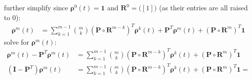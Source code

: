 \documentclass[\main/main.tex]{subfiles}
\begin{document}
further simplify since $\bm{\rho}^0(t) = \bm{1}$ and $\mathbf{R}^0 = \big ([1]\big)$ (as their entries are all raised to $0$):
\begin{equation}\label{mom}
\begin{split}
     \bm{\rho}^m(t) &= 
     \sum_{k=1}^{m-1} {m \choose k} (\mathbf{P} \circ \mathbf{R}^{m-k}) ^ T \bm{\rho}^k(t) +
     \mathbf{P} ^ T \bm{\rho}^m(t) + (\mathbf{P} \circ \mathbf{R}^{m}) ^ T \bm{1}
\end{split}
    \end{equation}
solve for $\bm{\rho}^m(t)$:    
\begin{equation}
\begin{split}
     \bm{\rho}^m(t) - \mathbf{P} ^ T \bm{\rho}^m(t) &= 
     \sum_{k=1}^{m-1} {m \choose k} (\mathbf{P} \circ \mathbf{R}^{m-k}) ^ T \bm{\rho}^k(t)
     + (\mathbf{P} \circ \mathbf{R}^{m}) ^ T \bm{1}\\
     ( \mathbf{I} - \mathbf{P}^T)  \bm{\rho}^m(t) &= 
     \sum_{k=1}^{m-1} {m \choose k} (\mathbf{P} \circ \mathbf{R}^{m-k}) ^ T \bm{\rho}^k(t)
     + (\mathbf{P} \circ \mathbf{R}^{m}) ^ T \bm{1} = 
\end{split}
    \end{equation}
\end{document}
